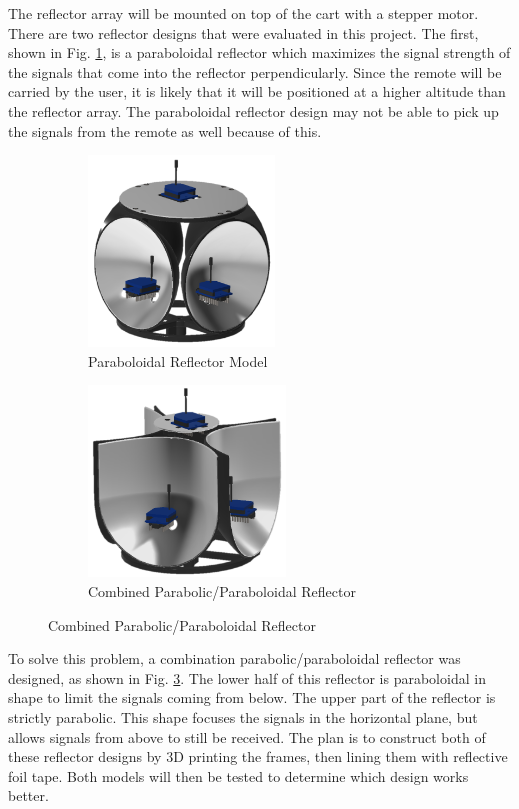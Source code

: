 \vspace*{12pt}
\noindent
The reflector array will be mounted on top of the cart with a stepper motor.
There are two reflector designs that were evaluated in this project. The first,
shown in Fig. \ref{fig:parabolodialReflector}, is a paraboloidal reflector which
maximizes the signal strength of the signals that come into the reflector
perpendicularly. Since the remote will be carried by the user, it is likely that
it will be positioned at a higher altitude than the reflector array. The
paraboloidal reflector design may not be able to pick up the signals from the
remote as well because of this. %
%
%
\begin{figure}[H]
  \centering
  \begin{subfigure}[t]{0.5\textwidth}
    \centering
    \includegraphics[height=2in]{figs/img/paraboloidalReflector}
    \captionsetup{width=\textwidth, justification=raggedright}
    \caption{Paraboloidal Reflector Model}
    \label{fig:parabolodialReflector}
  \end{subfigure}
  \begin{subfigure}[t]{0.4\textwidth}
    \centering
    \includegraphics[height=2in]{figs/img/parabolicReflector}
    \captionsetup{width=\textwidth, justification=raggedright}
    \caption{Combined Parabolic/Paraboloidal Reflector}
    \label{fig:parabolicReflector1}
  \end{subfigure}
\end{figure}
%
To solve this problem, a combination parabolic/paraboloidal reflector was
designed, as shown in Fig. \ref{fig:parabolicReflector1}. The lower half of this
reflector is paraboloidal in shape to limit the signals coming from below. The
upper part of the reflector is strictly parabolic. This shape focuses the
signals in the horizontal plane, but allows signals from above to still be
received. The plan is to construct both of these reflector designs by 3D
printing the frames, then lining them with reflective foil tape. Both models
will then be tested to determine which design works better.


